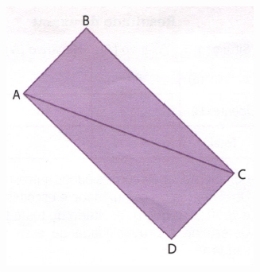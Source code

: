 \documentclass[a4paper,14pt]{article}
\begin{document}
\begin{multicols}{2}
\begin{enumerate}
			\includegraphics[width=1\linewidth]{6FMA123_imagens/imagem14} \\ 
		\end{enumerate}
		$~$ \\ $~$ \\ $~$ \\ $~$ \\ $~$ \\ $~$ \\ $~$ \\ $~$ \\ $~$ \\ $~$ \\ $~$ \\ $~$ \\ $~$ \\ $~$ \\ $~$ \\ $~$ \\ $~$ \\ $~$ \\ $~$
	\end{multicols}
\end{document}
